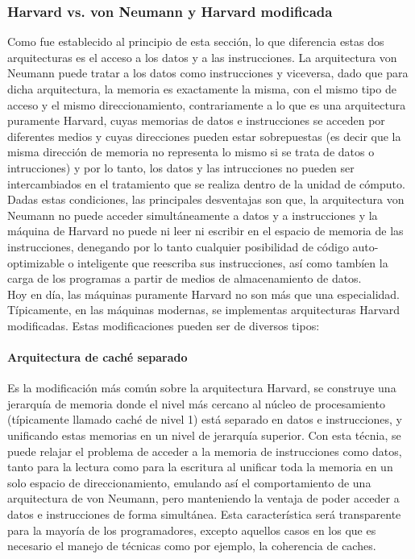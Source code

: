 \subsubsection{Harvard vs. von Neumann y Harvard modificada}
\label{subsubsec:theory-modern-memory_access-modified_harvard}

Como fue establecido al principio de esta sección, lo que diferencia estas dos
arquitecturas es el acceso a los datos y a las instrucciones. La arquitectura
von Neumann puede tratar a los datos como instrucciones y viceversa, dado que
para dicha arquitectura, la memoria es exactamente la misma, con el mismo tipo
de acceso y el mismo direccionamiento, contrariamente a lo que es una
arquitectura puramente Harvard, cuyas memorias de datos e instrucciones se
acceden por diferentes medios y cuyas direcciones pueden estar sobrepuestas (es
decir que la misma dirección de memoria no representa lo mismo si se trata de
datos o intrucciones) y por lo tanto, los datos y las intrucciones no pueden ser
intercambiados en el tratamiento que se realiza dentro de la unidad de cómputo.
Dadas estas condiciones, las principales desventajas son que, la arquitectura
von Neumann no puede acceder simultáneamente a datos y a instrucciones y la
máquina de Harvard no puede ni leer ni escribir en el espacio de memoria de las
instrucciones, denegando por lo tanto cualquier posibilidad de código
auto-optimizable o inteligente que reescriba sus instrucciones, así como tambíen
la carga de los programas a partir de medios de almacenamiento de datos.\\
Hoy en día, las máquinas puramente Harvard no son más que una especialidad.
Típicamente, en las máquinas modernas, se implementas arquitecturas Harvard
modificadas. Estas modificaciones pueden ser de diversos tipos:

\paragraph{Arquitectura de caché separado}
\label{par:theory-modern-memory_access-modified_harvard-split_cache}

Es la modificación más común sobre la arquitectura Harvard, se construye una
jerarquía de memoria donde el nivel más cercano al núcleo de procesamiento
(típicamente llamado caché de nivel 1) está separado en datos e instrucciones, y
unificando estas memorias en un nivel de jerarquía superior. Con esta técnia, se
puede relajar el problema de acceder a la memoria de instrucciones como datos,
tanto para la lectura como para la escritura al unificar toda la memoria en un
solo espacio de direccionamiento, emulando así el comportamiento de una
arquitectura de von Neumann, pero manteniendo la ventaja de poder acceder a
datos e instrucciones de forma simultánea. Esta característica será transparente
para la mayoría de los programadores, excepto aquellos casos en los que es
necesario el manejo de técnicas como por ejemplo, la coherencia de caches.

